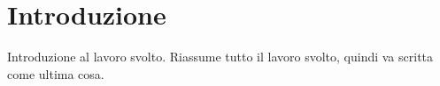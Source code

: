 \section{Introduzione}

Introduzione al lavoro svolto. Riassume tutto il lavoro svolto, quindi
va scritta come ultima cosa.






